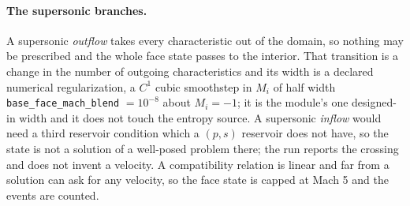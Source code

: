 \paragraph{The supersonic branches.}
A supersonic \emph{outflow} takes every characteristic out of the domain, so
nothing may be prescribed and the whole face state passes to the interior.
That transition is a change in the number of outgoing characteristics and its
width is a declared numerical regularization, a $C^1$ cubic smoothstep in
$M_i$ of half width \texttt{base\_face\_mach\_blend} $=10^{-8}$ about
$M_i=-1$; it is the module's one designed-in width and it does not touch the
entropy source.  A supersonic \emph{inflow} would need a third reservoir
condition which a $(p,s)$ reservoir does not have, so the state is not a
solution of a well-posed problem there; the run reports the crossing and does
not invent a velocity.  A compatibility relation is linear and far from a
solution can ask for any velocity, so the face state is capped at Mach 5 and
the events are counted.

